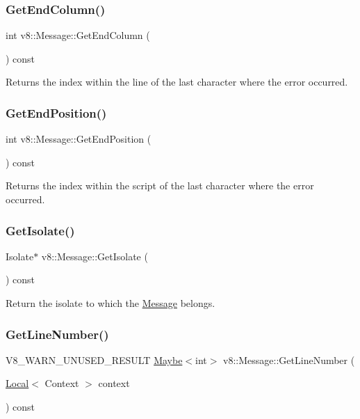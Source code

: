 \subsubsection{\texorpdfstring{Get\+End\+Column()}{GetEndColumn()}}
{\footnotesize\ttfamily int v8\+::\+Message\+::\+Get\+End\+Column (\begin{DoxyParamCaption}{ }\end{DoxyParamCaption}) const}

Returns the index within the line of the last character where the error occurred. \mbox{\label{classv8_1_1Message_a9a6c55ffea2eb6841d67afec40300641}} 
\subsubsection{\texorpdfstring{Get\+End\+Position()}{GetEndPosition()}}
{\footnotesize\ttfamily int v8\+::\+Message\+::\+Get\+End\+Position (\begin{DoxyParamCaption}{ }\end{DoxyParamCaption}) const}

Returns the index within the script of the last character where the error occurred. \mbox{\label{classv8_1_1Message_a42aa664083e0fd29ab802c289b87d52b}} 
\subsubsection{\texorpdfstring{Get\+Isolate()}{GetIsolate()}}
{\footnotesize\ttfamily Isolate$\ast$ v8\+::\+Message\+::\+Get\+Isolate (\begin{DoxyParamCaption}{ }\end{DoxyParamCaption}) const}

Return the isolate to which the \mbox{\hyperlink{classv8_1_1Message}{Message}} belongs. \mbox{\label{classv8_1_1Message_a14934ab71695e916dfacb31b932e21d7}} 
\subsubsection{\texorpdfstring{Get\+Line\+Number()}{GetLineNumber()}}
{\footnotesize\ttfamily V8\+\_\+\+W\+A\+R\+N\+\_\+\+U\+N\+U\+S\+E\+D\+\_\+\+R\+E\+S\+U\+LT \mbox{\hyperlink{classv8_1_1Maybe}{Maybe}}$<$int$>$ v8\+::\+Message\+::\+Get\+Line\+Number (\begin{DoxyParamCaption}\item[{\mbox{\hyperlink{classv8_1_1Local}{Local}}$<$ Context $>$}]{context }\end{DoxyParamCaption}) const}

